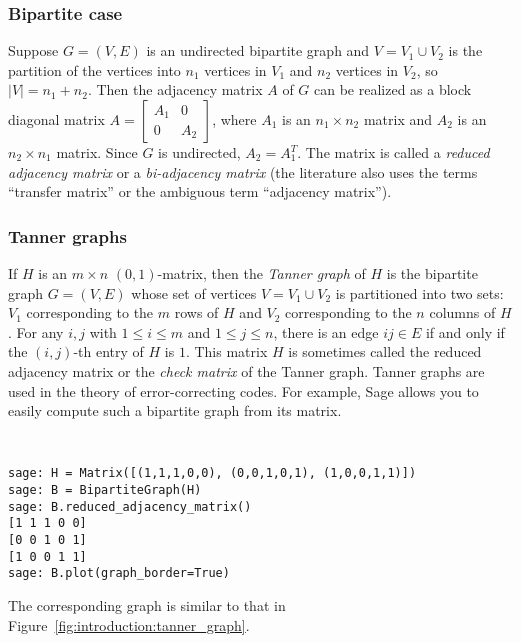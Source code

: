 
\subsubsection{Bipartite case}

Suppose $G = (V, E)$ is an undirected bipartite graph and
$V = V_1 \cup V_2$ is the partition of the vertices into $n_1$
vertices in $V_1$ and $n_2$ vertices in $V_2$, so $|V| = n_1 + n_2$.
Then the adjacency matrix $A$ of $G$ can be realized as a block
diagonal matrix
$A
=
\begin{bmatrix}
A_1 & 0 \\
0 & A_2
\end{bmatrix}$,
where $A_1$ is an $n_1 \times n_2$ matrix and $A_2$ is an
$n_2 \times n_1$ matrix. Since $G$ is undirected, $A_2 = A_1^T$.
The matrix is called a \emph{reduced adjacency matrix} or a
\emph{bi-adjacency matrix} (the literature also uses
the terms ``transfer matrix'' or the ambiguous term
``adjacency matrix'').



\subsubsection{Tanner graphs}

If $H$ is an $m \times n$ $(0,1)$-matrix, then the \emph{Tanner graph}
of $H$ is the bipartite graph $G = (V,E)$ whose set of vertices
$V = V_1 \cup V_2$ is partitioned into two sets: $V_1$ corresponding
to the $m$ rows of $H$ and $V_2$ corresponding to the $n$ columns of $H$.
For any $i,j$ with $1 \leq i \leq m$ and $1 \leq j \leq n$, there is
an edge $ij \in E$ if and only if the $(i,j)$-th entry of $H$ is
$1$. This matrix $H$ is sometimes called the
reduced adjacency matrix or the \emph{check matrix} of the Tanner
graph. Tanner graphs are used in the theory of error-correcting
codes. For example, Sage allows you to easily compute such a bipartite
graph from its matrix.
%
\begin{center}
\fontsize{9pt}{9pt}
\selectfont
\tt
\begin{lstlisting}
sage: H = Matrix([(1,1,1,0,0), (0,0,1,0,1), (1,0,0,1,1)])
sage: B = BipartiteGraph(H)
sage: B.reduced_adjacency_matrix()
[1 1 1 0 0]
[0 0 1 0 1]
[1 0 0 1 1]
sage: B.plot(graph_border=True)
\end{lstlisting}
\end{center}
%
The corresponding graph is similar to that in
Figure~\ref{fig:introduction:tanner_graph}.


